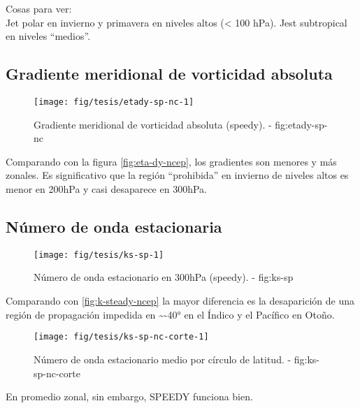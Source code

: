 \documentclass[spanish,a4paper]{book}
\begin{document}
Cosas para ver:\\
Jet polar en invierno y primavera en niveles altos (\textless{} 100
hPa). Jest subtropical en niveles ``medios''.

\subsection{Gradiente meridional de vorticidad
absoluta}\label{gradiente-meridional-de-vorticidad-absoluta-1}

\begin{landscape}\begin{figure}

{\centering \texttt{[image: fig/tesis/etady-sp-nc-1]} 

}

\caption{Gradiente meridional de vorticidad absoluta (speedy). - fig:etady-sp-nc}\label{fig:etady-sp-nc}
\end{figure}
\end{landscape}

Comparando con la figura \autoref{fig:eta-dy-ncep}, los gradientes son
menores y más zonales. Es significativo que la región ``prohibida'' en
invierno de niveles altos es menor en 200hPa y casi desaparece en
300hPa.

\subsection{Número de onda
estacionaria}\label{numero-de-onda-estacionaria}

\begin{figure*}
\texttt{[image: fig/tesis/ks-sp-1]} \caption{Número de onda estacionario en 300hPa (speedy). - fig:ks-sp}\label{fig:ks-sp}
\end{figure*}

Comparando con \autoref{fig:k-steady-ncep} la mayor diferencia es la
desaparición de una región de propagación impedida en
\textasciitilde{}-40° en el Índico y el Pacífico en Otoño.

\begin{figure}

{\centering \texttt{[image: fig/tesis/ks-sp-nc-corte-1]} 

}

\caption{Número de onda estacionario medio por círculo de latitud. - fig:ks-sp-nc-corte}\label{fig:ks-sp-nc-corte}
\end{figure}

En promedio zonal, sin embargo, SPEEDY funciona bien.
\end{document}
